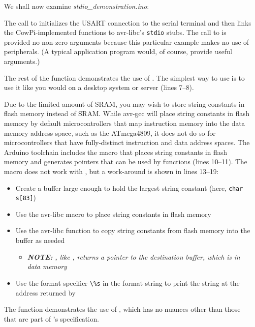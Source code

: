 {    We shall now examine \textit{stdio\_demonstration.ino}:

    

    The call to \hyperlink{function:cowpi_stdio_setup}{} initializes the USART connection to the serial terminal and then links the CowPi-implemented functions to avr-libc's \texttt{stdio} stubs.
    The call to \hyperlink{function:cowpi_setup}{} is provided no non-zero arguments because this particular example makes no use of peripherals.
    (A typical application program would, of course, provide useful arguments.)

    The rest of the  function demonstrates the use of .
    The simplest way to use  is to use it like you would on a desktop system or server (lines 7--8).

    Due to the limited amount of SRAM, you may wish to store string constants in flash memory instead of SRAM.
    While avr-gcc will place string constants in flash memory by default microcontrollers that map instruction memory into the data memory address space, such as the ATmega4809, it does not do so for microcontrollers that have fully-distinct instruction and data address spaces.
    The Arduino toolchain includes the  macro that places string constants in flash memory and generates pointers that can be used by  functions (lines 10--11).
    The  macro does not work with , but a work-around is shown in lines 13--19:
    \begin{itemize}
        \item Create a buffer large enough to hold the largest string constant (here, \lstinline{char s[83]})
        \item Use the avr-libc  macro to place string constants in flash memory
        \item Use the avr-libc  function to copy string constants from flash memory into the buffer as needed
            \begin{itemize}
                \item \textit{\textbf{NOTE:} , like , returns a pointer to the destination buffer, which is in data memory}
            \end{itemize}
        \item Use the format specifier \lstinline{\%s} in the  format string to print the string at the address returned by 
    \end{itemize}

    The  function demonstrates the use of , which has no nuances other than those that are part of 's specification.
}{}

